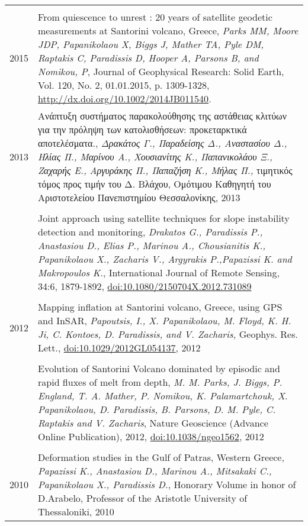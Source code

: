 \documentclass[a4paper,10pt]{article} %
\begin{document}
\begin{longtable}{r|p{14cm}}
\multicolumn{2}{c}{} \\
  \textsc{2015}
  & From quiescence to unrest : 20 years of satellite geodetic measurements at Santorini volcano, Greece,
  \emph{Parks MM, Moore JDP, Papanikolaou X, Biggs J, Mather TA, Pyle DM, Raptakis C, Paradissis D, Hooper A, Parsons B, and Nomikou, P},
  Journal of Geophysical Research: Solid Earth, Vol. 120, No. 2, 01.01.2015, p. 1309-1328,
  \href{http://dx.doi.org/10.1002/2014JB011540}{http://dx.doi.org/10.1002/2014JB011540}.

\multicolumn{2}{c}{} \\
  \textsc{2013}
  & Ανάπτυξη συστήματος παρακολούθησης της αστάθειας κλιτύων για την πρόληψη των κατολισθήσεων: προκεταρκτικά αποτελέσματα.,
  \emph{Δρακάτος Γ., Παραδείσης Δ., Αναστασίου Δ., Ηλίας Π., Μαρίνου Α., Χουσιανίτης Κ., Παπανικολάου Ξ., Ζαχαρής Ε., Αργυράκης Π., Παπαζήση Κ., Μήλας Π.,}
  τιμητικός τόμος προς τιμήν του Δ. Βλάχου, Ομότιμου Καθηγητή του Αριστοτελείου Πανεπιστημίου Θεσσαλονίκης, 2013\\

  &\\

  & Joint approach using satellite techniques for slope instability detection and monitoring,
  \emph{Drakatos G., Paradissis P., Anastasiou D., Elias P., Marinou A., Chousianitis K., Papanikolaou X., Zacharis V., Argyrakis P.,Papazissi K. and Makropoulos K.},
  International Journal of Remote Sensing, 34:6, 1879-1892, \href{http://www.tandfonline.com/doi/abs/10.1080/2150704X.2012.731089#.Uxni9meIaig}{doi:10.1080/2150704X.2012.731089}\\

\multicolumn{2}{c}{} \\ 
  \textsc{2012}
  & Mapping inflation at Santorini volcano, Greece, using GPS and InSAR,
  \emph{Papoutsis, I., X. Papanikolaou, M. Floyd, K. H. Ji, C. Kontoes, D. Paradissis, and V. Zacharis,}
  Geophys. Res. Lett., \href{http://www.agu.org/pubs/crossref/pip/2012GL054137.shtml}{doi:10.1029/2012GL054137}, 2012\\

  &\\

  & Evolution of Santorini Volcano dominated by episodic and rapid fluxes of melt from depth,
  \emph{M. M. Parks, J. Biggs, P. England, T. A. Mather, P. Nomikou, K. Palamartchouk, X. Papanikolaou, D. Paradissis, B. Parsons, D. M. Pyle, C. Raptakis and V. Zacharis},
  Nature Geoscience (Advance Online Publication), 2012, \href{http://www.nature.com/ngeo/journal/v5/n10/full/ngeo1562.html}{doi:10.1038/ngeo1562}, 2012\\

\multicolumn{2}{c}{} \\ 
  \textsc{2010}
  & Deformation studies in the Gulf of Patras, Western Greece,
  \emph{Papazissi K., Anastasiou D., Marinou A., Mitsakaki C., Papanikolaou X., Paradissis D.}, 
  Honorary Volume in honor of D.Arabelo, Professor of the Aristotle University of Thessaloniki, 2010\\
\end{longtable}
\end{document}
